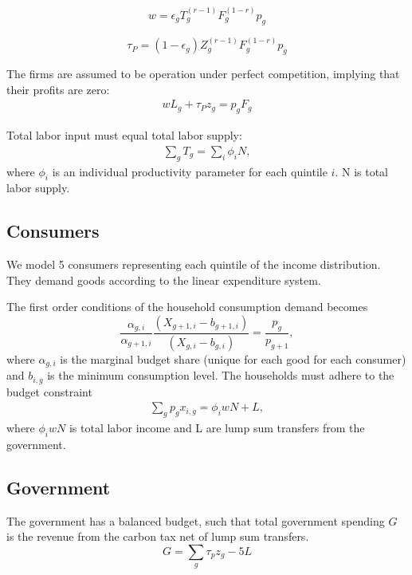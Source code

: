 \begin{equation}
    w= \epsilon_gT_g^{(r-1)}F_g^{(1-r)}p_g
\end{equation}

\begin{equation}
   \tau_P = (1-\epsilon_g)Z_g^{(r-1)}F_g^{(1-r)}p_g
\end{equation}

The firms are assumed to be operation under perfect competition, implying that their profits are zero:
\begin{align}
    w L_g + \tau_P z_g = p_g F_g
\end{align}

Total labor input must equal total labor supply:
\begin{align}
    \sum_g T_g = \sum_i \phi_i N,
\end{align}
where $\phi_i$ is an individual productivity parameter for each quintile $i$. N is total labor supply.

\subsection{Consumers}
We model 5 consumers representing each quintile of the income distribution. They demand goods according to the linear expenditure system. 

The first order conditions of the household consumption demand becomes
\begin{equation}
    \frac{\alpha_{g,i}}{\alpha_{g+1,i}}\frac{(X_{g+1,i} - b_{g+1,i})}{(X_{g,i} - b_{g,i})}=\frac{p_g}{p_{g+1}}, 
\end{equation}
where $\alpha_{g,i}$ is the marginal budget share (unique for each good for each consumer) and $b_{i,g}$ is the minimum consumption level. The households must adhere to the budget constraint
\begin{align}
    \sum_g p_g x_{i,g} = \phi_i w N + L,
\end{align}
where $\phi_i w N$ is total labor income and L are lump sum transfers from the government. 

\subsection{Government}
The government has a balanced budget, such that total government spending $G$ is the revenue from the carbon tax net of lump sum transfers.
\begin{equation}
    G = \sum_g \tau_p z_g - 5L
\end{equation}


